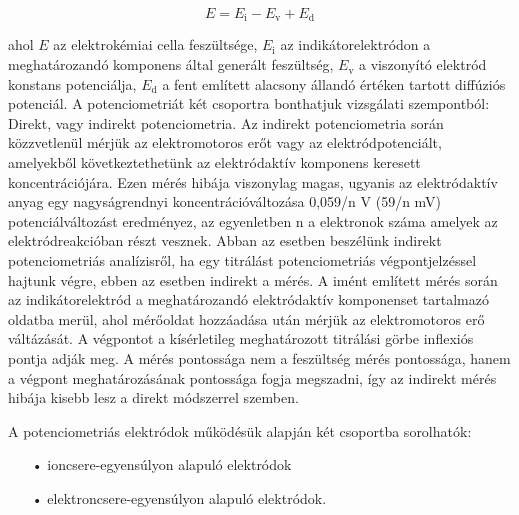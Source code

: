 \begin{equation}
E= E_\text{i} - E_\text{v} + E_\text{d}
\end{equation}

ahol $E$ az elektrokémiai cella feszültsége, $E_\text{i}$ az indikátorelektródon a meghatározandó komponens által generált feszültség, $E_\text{v}$ a viszonyító elektród konstans potenciálja, $E_\text{d}$ a fent említett alacsony állandó értéken tartott diffúziós potenciál.
A potenciometriát két csoportra bonthatjuk vizsgálati szempontból: Direkt, vagy indirekt potenciometria. Az indirekt potenciometria során közzvetlenül mérjük az elektromotoros erőt vagy az elektródpotenciált, amelyekből következtethetünk az elektródaktív komponens keresett koncentrációjára. Ezen mérés hibája viszonylag magas, ugyanis az elektródaktív anyag egy nagyságrendnyi koncentrációváltozása 0,059/n V (59/n mV) potenciálváltozást eredményez, az egyenletben n a elektronok száma amelyek az elektródreakcióban részt vesznek. Abban az esetben beszélünk indirekt potenciometriás analízisről, ha egy titrálást potenciometriás végpontjelzéssel hajtunk végre, ebben az esetben indirekt a mérés. A imént említett mérés során az indikátorelektród a meghatározandó elektródaktív komponenset tartalmazó oldatba merül, ahol mérőoldat hozzáadása után mérjük az elektromotoros erő váltázását. A végpontot a kísérletileg meghatározott titrálási görbe inflexiós pontja adják meg. A mérés pontossága nem a feszültség mérés  pontossága, hanem a végpont meghatározásának pontossága fogja megszadni, így az indirekt mérés hibája kisebb lesz a direkt módszerrel szemben.

A potenciometriás elektródok működésük alapján két csoportba sorolhatók:

\begin{itemize}
\item[•]ioncsere-egyensúlyon alapuló elektródok
\item[•]elektroncsere-egyensúlyon alapuló elektródok.
\end{itemize} 

